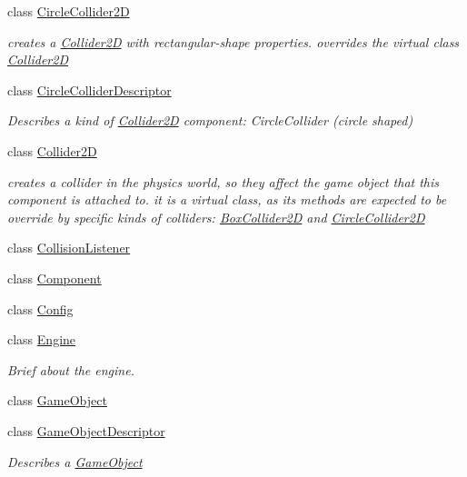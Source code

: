 \begin{DoxyCompactItemize}
class \hyperlink{class_mason_1_1_circle_collider2_d}{Circle\+Collider2D}
\begin{DoxyCompactList}\small\item\em creates a \hyperlink{class_mason_1_1_collider2_d}{Collider2D} with rectangular-\/shape properties. overrides the virtual class \hyperlink{class_mason_1_1_collider2_d}{Collider2D} \end{DoxyCompactList}\item 
class \hyperlink{class_mason_1_1_circle_collider_descriptor}{Circle\+Collider\+Descriptor}
\begin{DoxyCompactList}\small\item\em Describes a kind of \hyperlink{class_mason_1_1_collider2_d}{Collider2D} component\+: Circle\+Collider (circle shaped) ~\newline
 \end{DoxyCompactList}\item 
class \hyperlink{class_mason_1_1_collider2_d}{Collider2D}
\begin{DoxyCompactList}\small\item\em creates a collider in the physics world, so they affect the game object that this component is attached to. it is a virtual class, as its methods are expected to be override by specific kinds of colliders\+: \hyperlink{class_mason_1_1_box_collider2_d}{Box\+Collider2D} and \hyperlink{class_mason_1_1_circle_collider2_d}{Circle\+Collider2D} \end{DoxyCompactList}\item 
class \hyperlink{class_mason_1_1_collision_listener}{Collision\+Listener}
\item 
class \hyperlink{class_mason_1_1_component}{Component}
\item 
class \hyperlink{class_mason_1_1_config}{Config}
\item 
class \hyperlink{class_mason_1_1_engine}{Engine}
\begin{DoxyCompactList}\small\item\em Brief about the engine. \end{DoxyCompactList}\item 
class \hyperlink{class_mason_1_1_game_object}{Game\+Object}
\item 
class \hyperlink{class_mason_1_1_game_object_descriptor}{Game\+Object\+Descriptor}
\begin{DoxyCompactList}\small\item\em Describes a \hyperlink{class_mason_1_1_game_object}{Game\+Object} ~\newline

\end{DoxyCompactList}
\end{DoxyCompactItemize}
